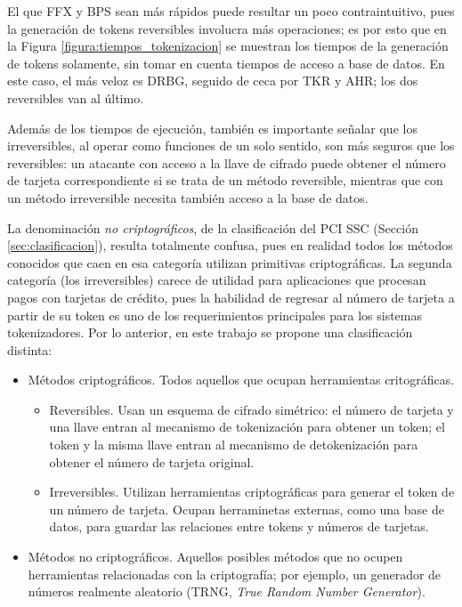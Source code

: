 El que FFX y BPS sean más rápidos puede resultar un poco contraintuitivo, pues
la generación de tokens reversibles involucra más operaciones; es por esto que
en la Figura \ref{figura:tiempos_tokenizacion} se muestran los tiempos de la
generación de tokens solamente, sin tomar en cuenta tiempos de acceso a base de
datos. En este caso, el más veloz es DRBG, seguido de ceca por TKR y AHR; los
dos reversibles van al último.

Además de los tiempos de ejecución, también es importante señalar que los
irreversibles, al operar como funciones de un solo sentido, son más
seguros que los reversibles: un atacante con acceso a la llave de cifrado puede
obtener el número de tarjeta correspondiente si se trata de un método
reversible, mientras que con un método irreversible necesita también acceso a la
base de datos.


La denominación \textit{no criptográficos}, de la clasificación del PCI SSC
(Sección \ref{sec:clasificacion}), resulta totalmente confusa, pues en
realidad todos los métodos conocidos que caen en esa categoría utilizan
primitivas criptográficas. La segunda categoría (los irreversibles) carece de
utilidad para aplicaciones que procesan pagos con tarjetas de crédito, pues la
habilidad de regresar al número de tarjeta a partir de su token es uno de los
requerimientos principales para los sistemas tokenizadores. Por lo anterior, en
este trabajo se propone una clasificación distinta:

\begin{itemize}
  \item Métodos criptográficos. Todos aquellos que ocupan herramientas
    critográficas.
    \begin{itemize}
      \item Reversibles. Usan un esquema de cifrado simétrico: el número
        de tarjeta y una llave entran al mecanismo de tokenización para obtener
        un token; el token y la misma llave entran al mecanismo de
        detokenización para obtener el número de tarjeta original.
      \item Irreversibles. Utilizan herramientas criptográficas para generar el
        token de un número de tarjeta. Ocupan herraminetas externas, como una
        base de datos, para guardar las relaciones entre tokens y números de
        tarjetas.
    \end{itemize}
  \item Métodos no criptográficos. Aquellos posibles métodos que no ocupen
    herramientas relacionadas con la criptografía; por ejemplo, un generador de
    números realmente aleatorio (TRNG, \textit{True Random Number Generator}).
\end{itemize}

